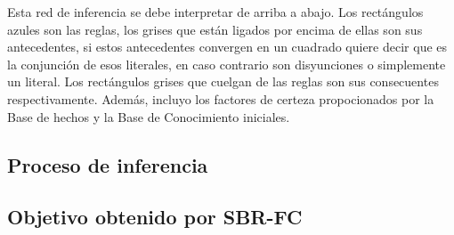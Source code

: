 \begin{center}
\end{center}
\par Esta red de inferencia se debe interpretar de arriba a abajo.
Los rectángulos azules son las reglas, los grises que están ligados por encima 
de ellas son sus antecedentes, si estos antecedentes convergen en un cuadrado 
quiere decir que es la conjunción de esos literales, en caso contrario son disyunciones
o simplemente un literal. Los rectángulos grises que cuelgan de las reglas 
son sus consecuentes respectivamente. Además, incluyo los factores de certeza propocionados por
la Base de hechos y la Base de Conocimiento iniciales.
\subsection{Proceso de inferencia}

\subsection{Objetivo obtenido por SBR-FC}


